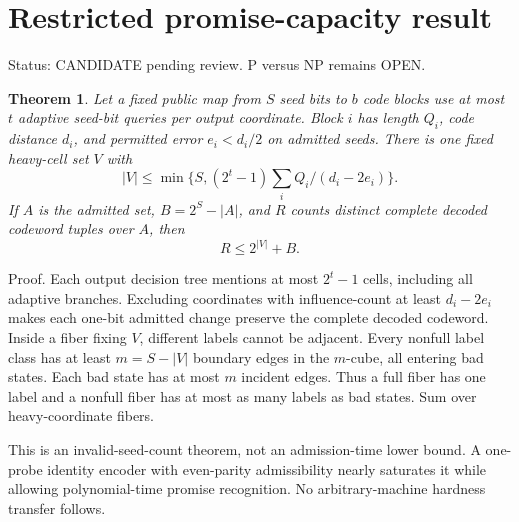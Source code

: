 \documentclass{article}
\newtheorem{theorem}{Theorem}
\begin{document}
\section*{Restricted promise-capacity result}
Status: CANDIDATE pending review. P versus NP remains OPEN.
\begin{theorem}
Let a fixed public map from $S$ seed bits to $b$ code blocks use at most $t$ adaptive seed-bit queries per output coordinate. Block $i$ has length $Q_i$, code distance $d_i$, and permitted error $e_i<d_i/2$ on admitted seeds. There is one fixed heavy-cell set $V$ with
\[
 |V|\le\min\{S,(2^t-1)\sum_iQ_i/(d_i-2e_i)\}.
\]
If $A$ is the admitted set, $B=2^S-|A|$, and $R$ counts distinct complete decoded codeword tuples over $A$, then
\[
 \boxed{R\le 2^{|V|}+B.}
\]
\end{theorem}
\noindent Proof. Each output decision tree mentions at most $2^t-1$ cells, including all adaptive branches. Excluding coordinates with influence-count at least $d_i-2e_i$ makes each one-bit admitted change preserve the complete decoded codeword. Inside a fiber fixing $V$, different labels cannot be adjacent. Every nonfull label class has at least $m=S-|V|$ boundary edges in the $m$-cube, all entering bad states. Each bad state has at most $m$ incident edges. Thus a full fiber has one label and a nonfull fiber has at most as many labels as bad states. Sum over heavy-coordinate fibers.

This is an invalid-seed-count theorem, not an admission-time lower bound. A one-probe identity encoder with even-parity admissibility nearly saturates it while allowing polynomial-time promise recognition. No arbitrary-machine hardness transfer follows.
\end{document}
